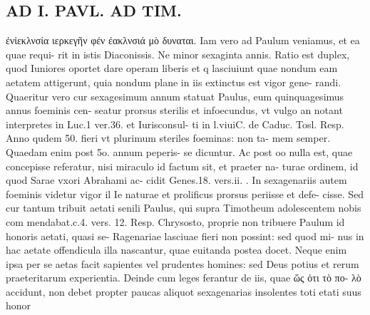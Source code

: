 \documentclass{article}
\begin{document}
\begin{pages}
\section*{AD I. PAVL. AD TIM. }
\marginpar{[ p.*24 ]}\pstart ἐνἰεκλνσία ιερκεγῆν φἐν ἐακλνσιά μὸ δυναται. Iam vero ad Paulum veniamus, et ea quae requi- rit in istis Diaconissis. Ne minor sexaginta annis. Ratio est duplex, quod Iuniores oportet dare operam liberis et q lasciuiunt quae nondum eam aetatem attigerunt, quia nondum plane in iis extinctus est vigor gene- randi. Quaeritur vero cur sexagesimum annum statuat Paulus, eum quinquagesimus annus foeminis cen- seatur prorsus sterilis et infoecundus, vt vulgo an notant interpretes in Luc.1 ver.36. et Iurisconsul- ti in l.viuiC. de Caduc. Tosl. Resp. Anno qudem 50. fieri vt plurimum steriles foeminas: non ta- mem semper. Quaedam enim post 5o. annum peperis- se dicuntur. Ac post oo nulla est, quae concepisse referatur, nisi miraculo id factum sit, et praeter na- turae ordinem, id quod Sarae vxori Abrahami ac- cidit Genes.18. vers.ii. . In sexagenariis autem foeminis videtur vigor il Ie naturae et prolificus prorsus periisse et defe- cisse. Sed cur tantum tribuit aetati senili Paulus, qui supra Timotheum adolescentem nobis com mendabat.c.4. vers. 12. Resp. Chrysosto, proprie non tribuere Paulum id honoris aetati, quasi se- Ragenariae lasciuae fieri non possint: sed quod mi- nus in hac aetate offendicula illa nascantur, quae euitanda postea docet. Neque enim ipsa per se aetas facit sapientes vel prudentes homines: sed Deus potius et rerum praeteritarum experientia. Deinde cum leges ferantur de iis, quae ὥς ὀτι τὸ πο- λὸ accidunt, non debet propter paucas aliquot sexagenarias insolentes toti etati suus honor  \pend

\end{pages}
\end{document}
